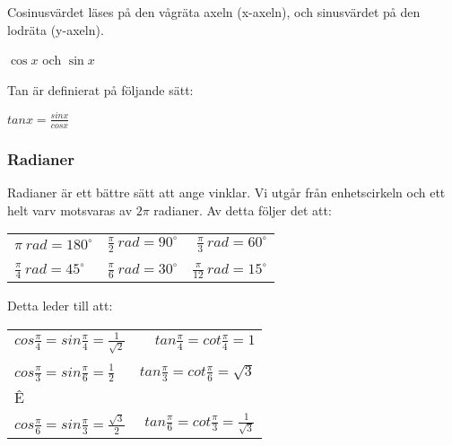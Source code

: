 \documentclass[11pt]{article}
\begin{document}
\begin{figure}[h]
  \begin{center}
  \end{center}
  \label{bild3}
\end{figure}
Cosinusvärdet läses på den vågräta axeln (x-axeln), och sinusvärdet på den lodräta (y-axeln). 
\begin{center}
\begin{figure}[h]
  \begin{center}
  \label{bild6}
  \end{center}
  \label{bild7}
\end{figure} 
$\cos x$ och $\sin x$
\end{center} 
Tan är definierat på följande sätt: 
\begin{center}
$tan x = \frac{sin x}{cos x}$
\end{center}


\subsubsection{Radianer}
Radianer är ett bättre sätt att ange vinklar. Vi utgår från enhetscirkeln och ett helt varv motsvaras av $2\pi$ radianer. Av detta följer det att: \\ 
\begin{center}
\begin{tabular}{lcr}
	$ \pi~rad = 180 ^\circ $	&	$ \frac{\pi}{2}~rad = 90^\circ $	&	$ \frac{\pi}{3}~rad= 60 ^\circ $ \\ \\
	$ \frac{\pi}{4}~rad= 45 ^\circ $ &	$ \frac{\pi}{6}~rad = 30^\circ $ 	&	$ \frac{\pi}{12}~rad= 15^\circ $ 
\end{tabular}
\end{center}
Detta leder till att: \\
\begin{center}
\begin{tabular}{lr}
	$ cos\frac{\pi}{4} = sin\frac{\pi}{4} = \frac{1}{\sqrt{2}}$	&	$ tan\frac{\pi}{4} = cot\frac{\pi}{4} = 1 $ \\ \\
	$ cos\frac{\pi}{3} = sin\frac{\pi}{6} = \frac{1}{2} $ &	$ tan \frac{\pi}{3} = cot\frac{\pi}{6} = \sqrt{3} $ \\Ê\\
	$ cos \frac{\pi}{6} = sin\frac{\pi}{3} = \frac{\sqrt{3}}{2}$	& 	$ tan\frac{\pi}{6} = cot\frac{\pi}{3} = \frac{1}{\sqrt{3}} $ 
\end{tabular}
\end{center}
\end{document}
